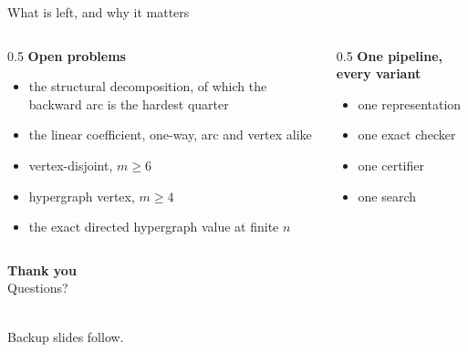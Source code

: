 \documentclass[aspectratio=1610,11pt]{beamer}
\begin{document}
\begin{frame}{What is left, and why it matters}
\vfill
\begin{columns}[t,onlytextwidth]
  \begin{column}{0.5\textwidth}
    {\large\bfseries\color{KULblauw1}Open problems}
    \begin{itemize}\itemsep8pt
      \item the structural decomposition, of which the backward arc is the hardest quarter
      \item the linear coefficient, one-way, arc and vertex alike
      \item vertex-disjoint, $m\ge6$
      \item hypergraph vertex, $m\ge4$
      \item the exact directed hypergraph value at finite $n$
    \end{itemize}
  \end{column}
  \begin{column}{0.5\textwidth}
    {\large\bfseries\color{KULblauw1}One pipeline, every variant}
    \begin{itemize}\itemsep10pt
      \item one representation
      \item one exact checker
      \item one certifier
      \item one search
    \end{itemize}
  \end{column}
\end{columns}
\vfill
\end{frame}

\begin{frame}[plain]
\centering
\vspace{1.7cm}
{\color{KULblauw3b}\fontsize{30}{34}\selectfont\bfseries Thank you}\\[12pt]
{\large\color{black!70}Questions?}\\[20pt]
\\[12pt]
{\small\color{black!55}Backup slides follow.}
\end{frame}
\end{document}
